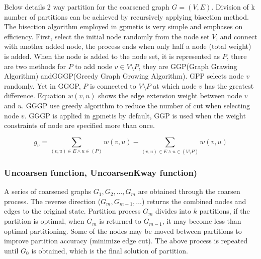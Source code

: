 Below details 2 way partition for the coarsened graph $G=(V,E)$. 
Division of k number of partitions can be achieved by recursively applying bisection method. The bisection algorithm employed in gpmetis is very simple and emphases on efficiency. First, select the initial node randomly from the node set $V$, and connect with  another added node, the process ends when only half a node (total weight) is added. 
When the node is added to the node set, it is represented as  $P$,  there are two methods for $P$ to add node $v\in V\setminus P$, they are GGP(Graph Grawing Algorithm) andGGGP(Greedy Graph Growing Algorithm). 
GPP selects node $v$ randomly. Yet in GGGP,  $P$ is connected to $V\setminus P$ at which node $v$ has the greatest difference. Equation  $w(v,u)$ shows the edge extension weight between node $v$ and $u$. 
GGGP use greedy algorithm to reduce the number of cut when selecting node $v$. 
GGGP is applied in gpmetis by default, GGP is used when the weight constraints of node are specified more than once.

 
{\footnotesize
\begin{equation}
g_v=\sum_{(v,u)\in E \wedge u\in(P)} w(v,u)  - \sum_{(v,u)\in E \wedge u\in (V\setminus P)} w(v,u)
\label{eq:gpmetis_gggp}
\end{equation}
}




\subsubsection{Uncoarsen function, UncoarsenKway function)}
A series of coarsened graphs $G_1,G_2,\dots,G_m$ are obtained through the coarsen process. The reverse direction  ($G_m,G_{m-1},\dots$) returns the combined nodes and edges to the original state. Partition process  $G_m$ divides into $k$ partitions, if the partition is optimal, when  $G_m$ is returned to $G_{m-1}$, it may become less than optimal partitioning. Some of the nodes may be moved between partitions to improve partition accuracy (minimize edge cut). The above process is repeated until $G_0$ is obtained, which is the final solution of partition. 
 
